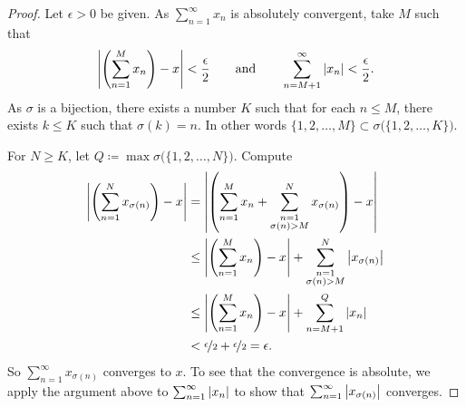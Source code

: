 \begin{proof}
Let $\epsilon > 0$ be given.  As $\sum_{n=1}^\infty x_n$ is absolutely convergent, take $M$ such that
\begin{equation*}
\left\lvert {\left(\sum_{n=1}^M x_n \right) - x} \right\rvert < \frac{\epsilon}{2}
\qquad \text{and} \qquad
\sum_{n=M+1}^\infty \left\lvert {x_n} \right\rvert < \frac{\epsilon}{2} .
\end{equation*}
As $\sigma$ is a bijection,
there exists a number $K$ such that for each
$n \leq M$, there exists $k \leq K$ such that $\sigma(k) = n$.
In other words
$\{ 1,2,\ldots,M \} \subset \sigma\bigl(\{ 1,2,\ldots,K \} \bigr)$.

For $N \geq K$, let $Q \coloneqq \max \sigma\bigl(\{ 1,2,\ldots,N \}\bigr)$.
Compute
\begin{equation*}
\begin{split}
\left\lvert {\left( \sum_{n=1}^N x_{\sigma(n)} \right) - x} \right\rvert
& =
\left\lvert { \left( \sum_{n=1}^M x_n
+
\sum_{\substack{n=1\\\sigma(n) > M}}^N x_{\sigma(n)} \right) - x} \right\rvert
\\
& \leq
\left\lvert { \left( \sum_{n=1}^M x_n \right) - x} \right\rvert
+
\sum_{\substack{n=1\\\sigma(n) > M}}^N \left\lvert {x_{\sigma(n)}} \right\rvert
\\
& \leq
\left\lvert { \left( \sum_{n=1}^M x_n \right) - x} \right\rvert
+
\sum_{n=M+1}^Q \left\lvert {x_{n}} \right\rvert
\\
& < \nicefrac{\epsilon}{2} + \nicefrac{\epsilon}{2} = \epsilon .
\end{split}
\end{equation*}
So 
$\sum_{n=1}^\infty x_{\sigma(n)}$ converges to $x$.  To see that the convergence
is absolute, we apply the argument above to $\sum_{n=1}^\infty \left\lvert {x_n} \right\rvert$ to show
that $\sum_{n=1}^\infty \left\lvert {x_{\sigma(n)}} \right\rvert$ converges.
\end{proof}


